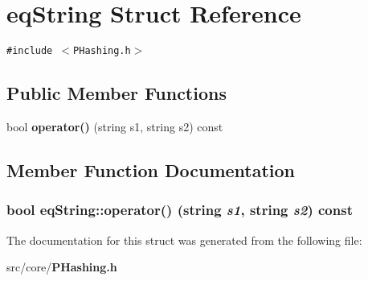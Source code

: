 \section{eq\-String Struct Reference}
\label{structeqString}
{\tt \#include $<$PHashing.h$>$}

\subsection*{Public Member Functions}
\begin{CompactItemize}
\item 
bool {\bf operator()} (string s1, string s2) const
\end{CompactItemize}


\subsection{Member Function Documentation}
\subsubsection{\setlength{\rightskip}{0pt plus 5cm}bool eq\-String::operator() (string {\em s1}, string {\em s2}) const\hspace{0.3cm}{\tt  [inline]}}\label{structeqString_31b4bd2ef4854845c00fb02b41ca2863}




The documentation for this struct was generated from the following file:\begin{CompactItemize}
\item 
src/core/{\bf PHashing.h}\end{CompactItemize}
